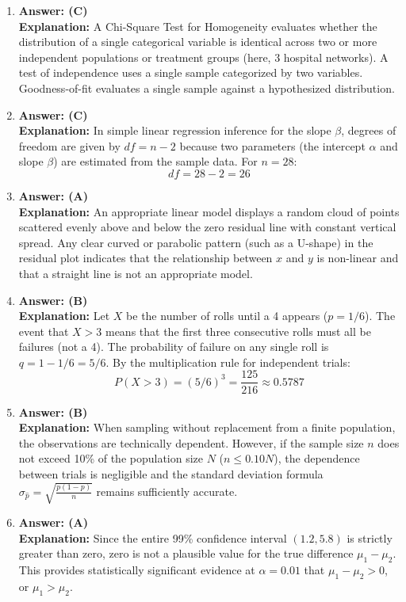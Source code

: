 \begin{enumerate}[leftmargin=1.5em]
  \item \textbf{Answer: (C)} \\
  \textbf{Explanation:} A Chi-Square Test for Homogeneity evaluates whether the distribution of a single categorical variable is identical across two or more independent populations or treatment groups (here, 3 hospital networks). A test of independence uses a single sample categorized by two variables. Goodness-of-fit evaluates a single sample against a hypothesized distribution.

  \item \textbf{Answer: (C)} \\
  \textbf{Explanation:} In simple linear regression inference for the slope $\beta$, degrees of freedom are given by $df = n - 2$ because two parameters (the intercept $\alpha$ and slope $\beta$) are estimated from the sample data. For $n = 28$:
  \[ df = 28 - 2 = 26 \]

  \item \textbf{Answer: (A)} \\
  \textbf{Explanation:} An appropriate linear model displays a random cloud of points scattered evenly above and below the zero residual line with constant vertical spread. Any clear curved or parabolic pattern (such as a U-shape) in the residual plot indicates that the relationship between $x$ and $y$ is non-linear and that a straight line is not an appropriate model.

  \item \textbf{Answer: (B)} \\
  \textbf{Explanation:} Let $X$ be the number of rolls until a 4 appears ($p = 1/6$). The event that $X > 3$ means that the first three consecutive rolls must all be failures (not a 4). The probability of failure on any single roll is $q = 1 - 1/6 = 5/6$. By the multiplication rule for independent trials:
  \[ P(X > 3) = (5/6)^3 = \frac{125}{216} \approx 0.5787 \]

  \item \textbf{Answer: (B)} \\
  \textbf{Explanation:} When sampling without replacement from a finite population, the observations are technically dependent. However, if the sample size $n$ does not exceed 10\% of the population size $N$ ($n \le 0.10N$), the dependence between trials is negligible and the standard deviation formula $\sigma_{\hat{p}} = \sqrt{\frac{p(1-p)}{n}}$ remains sufficiently accurate.

  \item \textbf{Answer: (A)} \\
  \textbf{Explanation:} Since the entire 99\% confidence interval $(1.2, 5.8)$ is strictly greater than zero, zero is not a plausible value for the true difference $\mu_1 - \mu_2$. This provides statistically significant evidence at $\alpha = 0.01$ that $\mu_1 - \mu_2 > 0$, or $\mu_1 > \mu_2$.


\end{enumerate}
